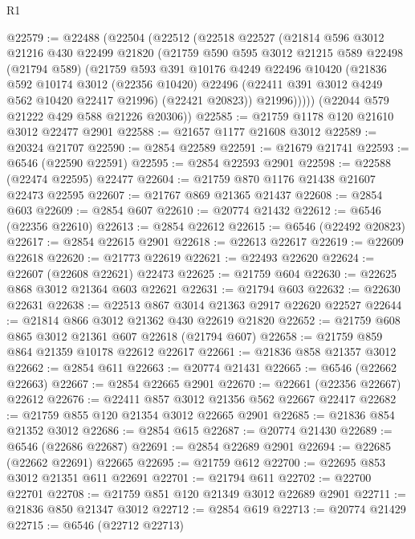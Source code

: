 \begin{lexlean}{R1}
\begin{coremodule}
@22579 := @22488
    (@22504
      (@22512
        (@22518
          @22527
          (@21814
            @596
            @3012
            @21216
            @430
            @22499
            @21820
            (@21759
              @590
              @595
              @3012
              @21215
              @589
              @22498
              (@21794 @589)
              (@21759
                @593
                @391
                @10176
                @4249
                @22496
                @10420
                (@21836
                  @592
                  @10174
                  @3012
                  (@22356 @10420)
                  @22496
                  (@22411 @391 @3012 @4249 @562 @10420 @22417 @21996)
                  (@22421 @20823))
                @21996)))))
      (@22044 @579 @21222 @429 @588 @21226 @20306))
@22585 := @21759 @1178 @120 @21610 @3012 @22477 @2901
@22588 := @21657 @1177 @21608 @3012
@22589 := @20324 @21707
@22590 := @2854 @22589
@22591 := @21679 @21741
@22593 := @6546 (@22590 @22591)
@22595 := @2854 @22593 @2901
@22598 := @22588 (@22474 @22595) @22477
@22604 := @21759 @870 @1176 @21438 @21607 @22473 @22595
@22607 := @21767 @869 @21365 @21437
@22608 := @2854 @603
@22609 := @2854 @607
@22610 := @20774 @21432
@22612 := @6546 (@22356 @22610)
@22613 := @2854 @22612
@22615 := @6546 (@22492 @20823)
@22617 := @2854 @22615 @2901
@22618 := @22613 @22617
@22619 := @22609 @22618
@22620 := @21773 @22619
@22621 := @22493 @22620
@22624 := @22607 (@22608 @22621) @22473
@22625 := @21759 @604
@22630 := @22625 @868 @3012 @21364 @603 @22621
@22631 := @21794 @603
@22632 := @22630 @22631
@22638 := @22513 @867 @3014 @21363 @2917 @22620 @22527
@22644 := @21814 @866 @3012 @21362 @430 @22619 @21820
@22652 := @21759 @608 @865 @3012 @21361 @607 @22618 (@21794 @607)
@22658 := @21759 @859 @864 @21359 @10178 @22612 @22617
@22661 := @21836 @858 @21357 @3012
@22662 := @2854 @611
@22663 := @20774 @21431
@22665 := @6546 (@22662 @22663)
@22667 := @2854 @22665 @2901
@22670 := @22661 (@22356 @22667) @22612
@22676 := @22411 @857 @3012 @21356 @562 @22667 @22417
@22682 := @21759 @855 @120 @21354 @3012 @22665 @2901
@22685 := @21836 @854 @21352 @3012
@22686 := @2854 @615
@22687 := @20774 @21430
@22689 := @6546 (@22686 @22687)
@22691 := @2854 @22689 @2901
@22694 := @22685 (@22662 @22691) @22665
@22695 := @21759 @612
@22700 := @22695 @853 @3012 @21351 @611 @22691
@22701 := @21794 @611
@22702 := @22700 @22701
@22708 := @21759 @851 @120 @21349 @3012 @22689 @2901
@22711 := @21836 @850 @21347 @3012
@22712 := @2854 @619
@22713 := @20774 @21429
@22715 := @6546 (@22712 @22713)

\end{coremodule}
\end{lexlean}
